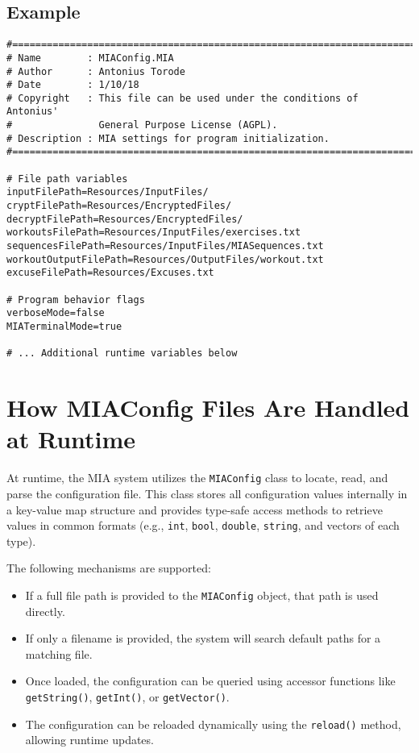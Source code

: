 \subsection*{Example}

\begin{lstlisting}[style=pythonstyle]
#============================================================================
# Name        : MIAConfig.MIA
# Author      : Antonius Torode
# Date        : 1/10/18
# Copyright   : This file can be used under the conditions of Antonius' 
#               General Purpose License (AGPL).
# Description : MIA settings for program initialization.
#============================================================================

# File path variables
inputFilePath=Resources/InputFiles/
cryptFilePath=Resources/EncryptedFiles/
decryptFilePath=Resources/EncryptedFiles/
workoutsFilePath=Resources/InputFiles/exercises.txt
sequencesFilePath=Resources/InputFiles/MIASequences.txt
workoutOutputFilePath=Resources/OutputFiles/workout.txt
excuseFilePath=Resources/Excuses.txt

# Program behavior flags
verboseMode=false
MIATerminalMode=true

# ... Additional runtime variables below
\end{lstlisting}

\section{How MIAConfig Files Are Handled at Runtime}

At runtime, the MIA system utilizes the \texttt{MIAConfig} class to locate, read, and parse the configuration file. This class stores all configuration values internally in a key-value map structure and provides type-safe access methods to retrieve values in common formats (e.g., \texttt{int}, \texttt{bool}, \texttt{double}, \texttt{string}, and vectors of each type).

The following mechanisms are supported:

\begin{itemize}\itemsep0em
	\item If a full file path is provided to the \texttt{MIAConfig} object, that path is used directly.
	\item If only a filename is provided, the system will search default paths for a matching file.
	\item Once loaded, the configuration can be queried using accessor functions like \texttt{getString()}, \texttt{getInt()}, or \texttt{getVector()}.
	\item The configuration can be reloaded dynamically using the \texttt{reload()} method, allowing runtime updates.
\end{itemize}

